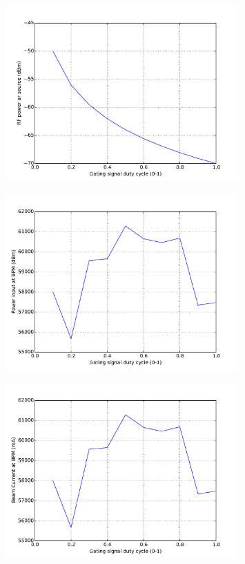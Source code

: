 \documentclass[a4paper, 11pt]{article}%
\begin{document}
\begin{figure}[htbp]%
\centering%
\includegraphics[width=0.8\textwidth]{./Results/scaled_DC_vs_Out_power.pdf}%
\caption{}%
\end{figure}

%


\begin{figure}[htbp]%
\centering%
\includegraphics[width=0.8\textwidth]{./Results/scaled_DC_vs_In_power.pdf}%
\caption{}%
\end{figure}

%


\begin{figure}[htbp]%
\centering%
\includegraphics[width=0.8\textwidth]{./Results/scaled_DC_vs_current.pdf}%
\caption{}%
\end{figure}
\end{document}
